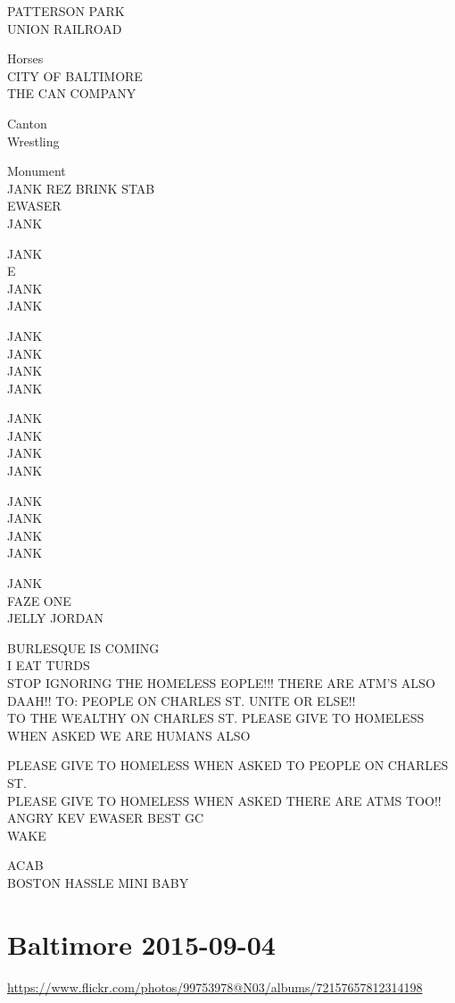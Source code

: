 \documentclass[10pt,letterpaper]{article}
\begin{document}
PATTERSON PARK\\
UNION RAILROAD

Horses\\
CITY OF BALTIMORE\\
THE CAN COMPANY

Canton\\
Wrestling

Monument\\
JANK REZ BRINK STAB\\
EWASER\\
JANK

JANK\\
E\\
JANK\\
JANK

JANK\\
JANK\\
JANK\\
JANK

JANK\\
JANK\\
JANK\\
JANK

JANK\\
JANK\\
JANK\\
JANK

JANK\\
FAZE ONE\\
JELLY JORDAN

BURLESQUE IS COMING\\
I EAT TURDS\\
STOP IGNORING THE HOMELESS EOPLE!!! THERE ARE ATM'S ALSO DAAH!! TO: PEOPLE ON CHARLES ST. UNITE OR ELSE!!\\
TO THE WEALTHY ON CHARLES ST.  PLEASE GIVE TO HOMELESS WHEN ASKED WE ARE HUMANS ALSO

PLEASE GIVE TO HOMELESS WHEN ASKED TO PEOPLE ON CHARLES ST.\\
PLEASE GIVE TO HOMELESS WHEN ASKED THERE ARE ATMS TOO!!\\
ANGRY KEV EWASER BEST GC\\
WAKE

ACAB\\
BOSTON HASSLE MINI BABY
\

\section*{Baltimore 2015-09-04}

\url{https://www.flickr.com/photos/99753978@N03/albums/72157657812314198}
\end{document}
